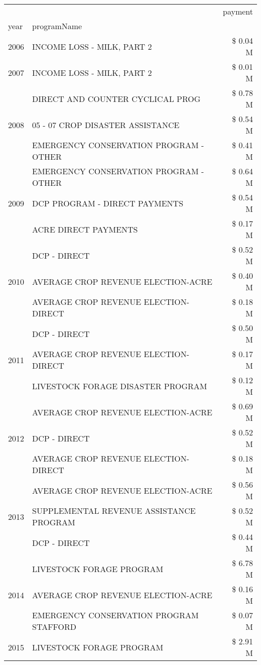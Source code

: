 \begin{tabular}{llr}
\toprule
 &  & payment \\
year & programName &  \\
\midrule
2006 & INCOME LOSS - MILK, PART 2 & \$ 0.04 M \\
\cline{1-3}
2007 & INCOME LOSS - MILK, PART 2 & \$ 0.01 M \\
\cline{1-3}
\multirow[t]{3}{*}{2008} & DIRECT AND COUNTER CYCLICAL PROG & \$ 0.78 M \\
 & 05 - 07 CROP DISASTER ASSISTANCE & \$ 0.54 M \\
 & EMERGENCY CONSERVATION PROGRAM - OTHER & \$ 0.41 M \\
\cline{1-3}
\multirow[t]{3}{*}{2009} & EMERGENCY CONSERVATION PROGRAM - OTHER & \$ 0.64 M \\
 & DCP PROGRAM - DIRECT PAYMENTS & \$ 0.54 M \\
 & ACRE DIRECT PAYMENTS & \$ 0.17 M \\
\cline{1-3}
\multirow[t]{3}{*}{2010} & DCP - DIRECT & \$ 0.52 M \\
 & AVERAGE CROP REVENUE ELECTION-ACRE & \$ 0.40 M \\
 & AVERAGE CROP REVENUE ELECTION-DIRECT & \$ 0.18 M \\
\cline{1-3}
\multirow[t]{3}{*}{2011} & DCP - DIRECT & \$ 0.50 M \\
 & AVERAGE CROP REVENUE ELECTION-DIRECT & \$ 0.17 M \\
 & LIVESTOCK FORAGE DISASTER PROGRAM & \$ 0.12 M \\
\cline{1-3}
\multirow[t]{3}{*}{2012} & AVERAGE CROP REVENUE ELECTION-ACRE & \$ 0.69 M \\
 & DCP - DIRECT & \$ 0.52 M \\
 & AVERAGE CROP REVENUE ELECTION-DIRECT & \$ 0.18 M \\
\cline{1-3}
\multirow[t]{3}{*}{2013} & AVERAGE CROP REVENUE ELECTION-ACRE & \$ 0.56 M \\
 & SUPPLEMENTAL REVENUE ASSISTANCE PROGRAM & \$ 0.52 M \\
 & DCP - DIRECT & \$ 0.44 M \\
\cline{1-3}
\multirow[t]{3}{*}{2014} & LIVESTOCK FORAGE PROGRAM & \$ 6.78 M \\
 & AVERAGE CROP REVENUE ELECTION-ACRE & \$ 0.16 M \\
 & EMERGENCY CONSERVATION PROGRAM STAFFORD & \$ 0.07 M \\
\cline{1-3}
\multirow[t]{3}{*}{2015} & LIVESTOCK FORAGE PROGRAM & \$ 2.91 M \\

\end{tabular}
